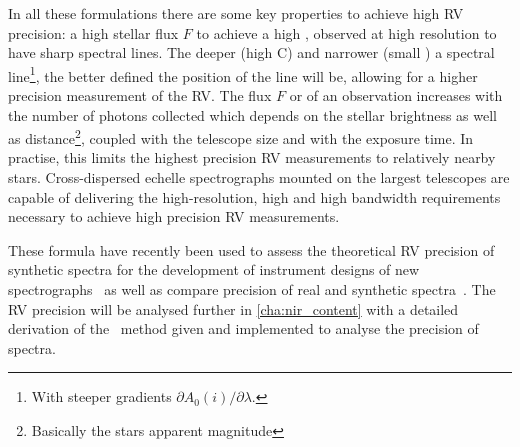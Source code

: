 In all these formulations there are some key properties to achieve high {RV} precision: a high stellar flux $F$ to achieve a high \snr{}, observed at high resolution to have sharp spectral lines.
The deeper (high C) and narrower (small \fwhm{}) a spectral line\footnote{With steeper gradients $\partial A_0(i)/\partial\lambda$.}, the better defined the position of the line will be, allowing for a higher precision measurement of the {RV}.
The flux $F$ or \snr{} of an observation increases with the number of photons collected which depends on the stellar brightness as well as distance\footnote{Basically the stars apparent magnitude}, coupled with the telescope size and with the exposure time.
In practise, this limits the highest precision {RV} measurements to relatively nearby stars.
Cross-dispersed echelle spectrographs mounted on the largest telescopes are capable of delivering the high-resolution, high \snr{} and high bandwidth requirements necessary to achieve high precision {RV} measurements.

These formula have recently been used to assess the theoretical {RV} precision of synthetic spectra for the development of instrument designs of new \nir{} spectrographs~\citep[e.g.][]{figueira_radial_2016} as well as compare precision of real and synthetic spectra~\citep[e.g.][]{artigau_optical_2018}.
The {RV} precision will be analysed further in \cref{cha:nir_content} with a detailed derivation of the~\citet{bouchy_fundamental_2001} method given and implemented to analyse the precision of \nir{} spectra.

